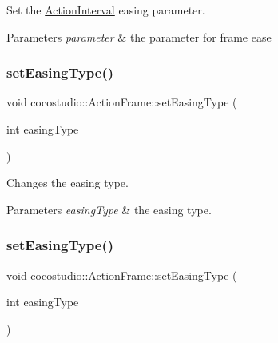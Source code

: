 Set the \hyperlink{classActionInterval}{Action\+Interval} easing parameter.


\begin{DoxyParams}{Parameters}
{\em parameter} & the parameter for frame ease \\
\hline
\end{DoxyParams}
\mbox{\label{classcocostudio_1_1ActionFrame_ac853eabdb94f1f08deb52e09b8aece1d}} 
\subsubsection{\texorpdfstring{set\+Easing\+Type()}{setEasingType()}\hspace{0.1cm}{\footnotesize\ttfamily [1/2]}}
{\footnotesize\ttfamily void cocostudio\+::\+Action\+Frame\+::set\+Easing\+Type (\begin{DoxyParamCaption}\item[{int}]{easing\+Type }\end{DoxyParamCaption})}

Changes the easing type.


\begin{DoxyParams}{Parameters}
{\em easing\+Type} & the easing type. \\
\hline
\end{DoxyParams}
\mbox{\label{classcocostudio_1_1ActionFrame_ac853eabdb94f1f08deb52e09b8aece1d}} 
\subsubsection{\texorpdfstring{set\+Easing\+Type()}{setEasingType()}\hspace{0.1cm}{\footnotesize\ttfamily [2/2]}}
{\footnotesize\ttfamily void cocostudio\+::\+Action\+Frame\+::set\+Easing\+Type (\begin{DoxyParamCaption}\item[{int}]{easing\+Type }\end{DoxyParamCaption})}

